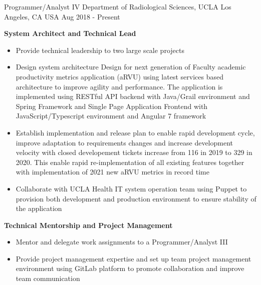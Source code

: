 


\begin{cventries}


	
  \cventry
    {Programmer/Analyst IV} %
    {Department of Radiological Sciences, UCLA} %
    {Los Angeles, CA USA} %
    {Aug 2018 - Present} %
    {
      \begin{cvitems} %
        \item[] { {\bf System Architect and Technical Lead}
            \begin{itemize} %
                \item {Provide technical leadership to two large scale projects}
                \item {Design system architecture Design for next generation of Faculty academic productivity metrics application (aRVU) using latest services based architecture to improve agility and performance. The application is implemented using RESTful API backend with Java/Grail environment and Spring Framework and Single Page Application Frontend with JavaScript/Typescript environment and Angular 7 framework}
                \item {Establish implementation and release plan to enable rapid development cycle, improve adaptation to requirements changes and increase development velocity with closed developement tickets increase from 116 in 2019 to 329 in 2020. This enable rapid re-implementation of all existing features together with implementation of 2021 new aRVU metrics in record time}
                \item {Collaborate with UCLA Health IT system operation team using Puppet to provision both development and production environment to ensure stability of the application}
              \end{itemize}}
        \item[] { {\bf Technical Mentorship and Project Management} 
            \begin{itemize} %
                \item {Mentor and delegate work assignments to a Programmer/Analyst III}
                \item {Provide project management expertise and set up team project management environment using GitLab platform to promote collaboration and improve team communication}
              \end{itemize}}
      \end{cvitems}
    }



\end{cventries}
